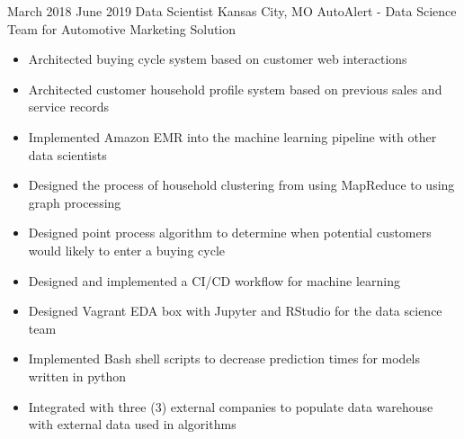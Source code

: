 \vspace*{0.05 in}

\ProjectExperience
{March 2018}
{June 2019}
{Data Scientist}
{Kansas City, MO}
{AutoAlert - Data Science Team for Automotive Marketing Solution}
{
    \begin{itemize}
        \item Architected buying cycle system based on customer web interactions
        \item Architected customer household profile system based on previous
        sales and service records
        \item Implemented Amazon EMR into the machine learning pipeline with
        other data scientists
    \end{itemize}
}
{
    \begin{itemize}
        \item Designed the process of household clustering from using MapReduce
        to using graph processing
        \item Designed point process algorithm to determine when potential
        customers would likely to enter a buying cycle
        \item Designed and implemented a CI/CD workflow for machine learning
        \item Designed Vagrant EDA box with Jupyter and RStudio for the data
        science team
    \end{itemize}
}
{
    \begin{itemize}
        \item Implemented Bash shell scripts to decrease prediction times for
        models written in python
        \item Integrated with three (3) external companies to populate data
        warehouse with external data used in algorithms
    \end{itemize}
}